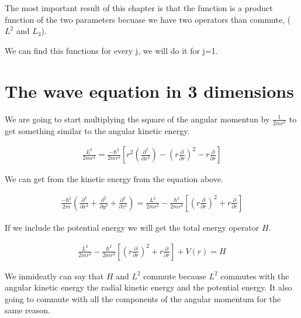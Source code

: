 The most important result of this chapter is that the function is a product function of the two parameters becuase we have two operators than commute, ($L^2$ and $L_3$).

We can find this functions for every j, we will do it for j=1.

%


%


\section{The wave equation in 3 dimensions}

We are going to start multiplying the square of the angular momentun by $\frac{1}{2mr^2}$ to get something similar to the angular kinetic energy.

\begin{equation}
  \begin{array}{c}
    \frac{L^2}{2mr^2} = \frac{-\hbar^2}{2mr^2}\left[r^2\left(\frac{\partial^2}{\partial x^2}\right)-\left(r\frac{\partial}{\partial r}\right)^2-r\frac{\partial}{\partial r}\right]
  \end{array}
\end{equation}

We can get from the kinetic energy from the equation above.

\begin{equation}
  \begin{array}{c}
    \frac{-\hbar^2}{2m} \left(\frac{\partial^2}{\partial x^2}+\frac{\partial^2}{\partial y^2}+\frac{\partial^2}{\partial z^2}\right) = \frac{L^2}{2mr^2}-\frac{\hbar^2}{2mr^2}\left[\left(r\frac{\partial}{\partial r}\right)^2+r\frac{\partial}{\partial r}\right]
  \end{array}
\end{equation}

If we include the potential energy we will get the total energy operator $H$.

\begin{equation}
  \begin{array}{c}
    \frac{L^2}{2mr^2}-\frac{\hbar^2}{2mr^2}\left[\left(r\frac{\partial}{\partial r}\right)^2+r\frac{\partial}{\partial r}\right] + V(r) = H
  \end{array}
\end{equation}

We inmideatly can say that $H$ and $L^2$ commute because $L^2$ commutes with the angular kinetic energy the radial kinetic energy and the potential energy. It also going to commute with all the components of the angular momentum for the same reason.

